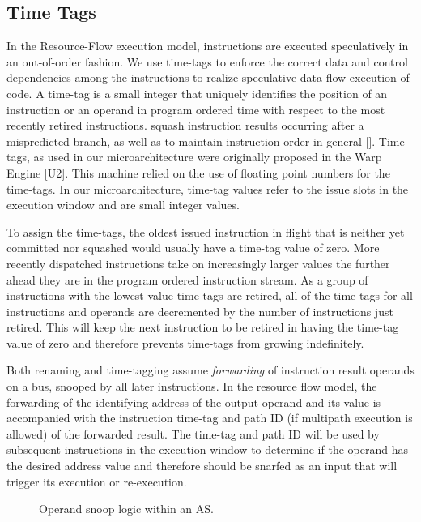 \documentclass[10pt,twocolumn]{IEEEtran}
\begin{document}
\subsection{Time Tags}


In the Resource-Flow execution model, instructions are executed
speculatively in an out-of-order fashion.  We use time-tags to enforce
the correct data and control dependencies among the instructions to
realize speculative data-flow execution of code.  A time-tag is a small
integer that uniquely identifies the position of an instruction or an
operand in program ordered time with respect to the most recently
retired instructions.  %
squash instruction results occurring after a mispredicted branch, as
well as to maintain instruction order in general [].  Time-tags, as
used in our microarchitecture were originally proposed in the Warp
Engine [U2].  This machine relied on the use of floating point numbers
for the time-tags.  In our microarchitecture, time-tag values refer to
the issue slots in the execution window and are small integer values.

To assign the time-tags, the oldest issued instruction in flight that
is neither yet committed nor squashed would usually have a time-tag
value of zero.  More recently dispatched instructions take on
increasingly larger values the further ahead they are in the program
ordered instruction stream.  As a group of instructions with the lowest
value time-tags are retired, all of the time-tags for all instructions
and operands are decremented by the number of instructions just
retired.  This will keep the next instruction to be retired in having
the time-tag value of zero and therefore prevents time-tags from
growing indefinitely.

Both renaming and time-tagging assume \emph{forwarding} of instruction
result operands on a bus, snooped by all later instructions.  In the
resource flow model, the forwarding of the identifying address of the
output operand and its value is accompanied with the instruction
time-tag and path ID (if multipath execution is allowed) of the
forwarded result.  The time-tag and path ID will be used by subsequent
instructions in the execution window to determine if the operand has
the desired address value and therefore should be snarfed as an input
that will trigger its execution or re-execution.

\begin{figure}
{}
\caption{Operand snoop logic within an AS.}
\label{fig:source}
\end{figure}  
 
\end{document}
